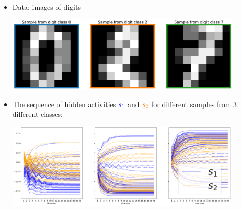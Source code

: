\begin{frame}{\subsecname}




\begin{minipage}{\textwidth}

    \begin{minipage}{0.65\textwidth}
    \begin{itemize}
        \item Data: images of digits
        
            \includegraphics[width=0.9\textwidth]{img/echo_sample_images}
        
        \item The sequence of hidden activities ${\color{blue}s_1}$ and ${\color{orange}s_2}$ for different samples from 3 different classes:
        
            \includegraphics[width=0.9\textwidth]{img/echo_hidden_vs_time}
    \end{itemize}
        

\end{minipage}
\end{minipage}
\end{frame}
